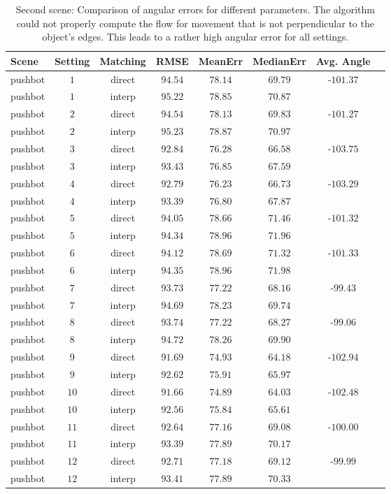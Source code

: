 \begin{table}[tb]
	\centering
		\begin{tabular}{lccccccc}
Scene & Setting & Matching & RMSE & MeanErr & MedianErr & Avg. Angle \\
\hline  \hline
pushbot & $1$ & direct & $94.54$ & $78.14$ & $69.79$ & -$101.37$ & \\
pushbot & $1$ & interp & $95.22$ & $78.85$ & $70.87$ &  & \\
pushbot & $2$ & direct & $94.54$ & $78.13$ & $69.83$ & -$101.27$ & \\
pushbot & $2$ & interp & $95.23$ & $78.87$ & $70.97$ &  & \\
pushbot & $3$ & direct & $92.84$ & $76.28$ & $66.58$ & -$103.75$ & \\
pushbot & $3$ & interp & $93.43$ & $76.85$ & $67.59$ &  & \\
pushbot & $4$ & direct & $92.79$ & $76.23$ & $66.73$ & -$103.29$ & \\
pushbot & $4$ & interp & $93.39$ & $76.80$ & $67.87$ &  & \\
pushbot & $5$ & direct & $94.05$ & $78.66$ & $71.46$ & -$101.32$ & \\
pushbot & $5$ & interp & $94.34$ & $78.96$ & $71.96$ &  & \\
pushbot & $6$ & direct & $94.12$ & $78.69$ & $71.32$ & -$101.33$ & \\
pushbot & $6$ & interp & $94.35$ & $78.96$ & $71.98$ &  & \\
pushbot & $7$ & direct & $93.73$ & $77.22$ & $68.16$ & -$99.43$ & \\
pushbot & $7$ & interp & $94.69$ & $78.23$ & $69.74$ &  & \\
pushbot & $8$ & direct & $93.74$ & $77.22$ & $68.27$ & -$99.06$ & \\
pushbot & $8$ & interp & $94.72$ & $78.26$ & $69.90$ &  & \\
pushbot & $9$ & direct & $91.69$ & $74.93$ & $64.18$ & -$102.94$ & \\
pushbot & $9$ & interp & $92.62$ & $75.91$ & $65.97$ &  & \\
pushbot & $10$ & direct & $91.66$ & $74.89$ & $64.03$ & -$102.48$ & \\
pushbot & $10$ & interp & $92.56$ & $75.84$ & $65.61$ &  & \\
pushbot & $11$ & direct & $92.64$ & $77.16$ & $69.08$ & -$100.00$ & \\
pushbot & $11$ & interp & $93.39$ & $77.89$ & $70.17$ &  & \\
pushbot & $12$ & direct & $92.71$ & $77.18$ & $69.12$ & -$99.99$ & \\
pushbot & $12$ & interp & $93.41$ & $77.89$ & $70.33$ &  & \\
		\end{tabular}
	\caption[Second scene: Comparison of angular errors for different parameters.]{Second scene: Comparison of angular errors for different parameters. The algorithm could not properly compute the flow for movement that is not perpendicular to the object's edges. This leads to a rather high angular error for all settings.}
	\label{tab:error_comparison_pushbot}
\end{table}


